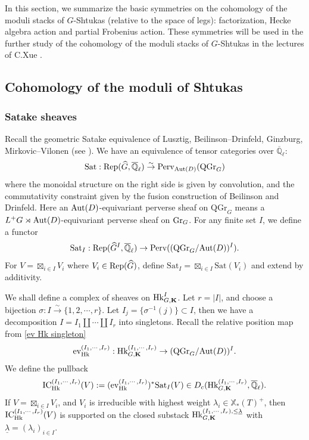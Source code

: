 \documentclass[11pt]{amsart}
\numberwithin{equation}{section}
\theoremstyle{plain}
\theoremstyle{definition}
\def\QQ{\mathbb{Q}}
\def\bK{\mathbf{K}}
\def\dG{\widehat{G}}
\newcommand\ev{\textup{ev}}
\newcommand{\Gr}{\textup{Gr}}
\newcommand{\Hk}{\textup{Hk}}
\newcommand\IC{\textup{IC}}
\newcommand\Perv{\textup{Perv}}
\newcommand\Rep{\textup{Rep}}
\newcommand\Aut{\textup{Aut}}
\newcommand\xcoch{\mathbb{X}_*}
\newcommand{\isom}{\stackrel{\sim}{\to}}
\newcommand{\Qlbar}{\overline{\QQ}_\ell}
\newcommand\un{\underline}
\newcommand\sss{\subsubsection}
\newcommand{\s}{\sigma}
\renewcommand{\l}{\lambda}
\newcommand{\QGr}{\mathrm{QGr}}
\newcommand{\Sat}{\mathrm{Sat}}
\begin{document}
In this section, we summarize the basic symmetries on the cohomology of the moduli stacks of $G$-Shtukas (relative to the space of legs): factorization, Hecke algebra action and partial Frobenius action. These symmetries will be used in the further study of the cohomology of the moduli stacks of $G$-Shtukas in the lectures of C.Xue \cite{Xue}.


 
\subsection{Cohomology of the moduli of Shtukas}


\sss{Satake sheaves}
Recall the geometric Satake equivalence of Lusztig, Beilinson--Drinfeld, Ginzburg, Mirkovic--Vilonen (see \cite{MV}). We have an equivalence of tensor categories over $\Qlbar$:
\begin{equation*}
\Sat: \Rep(\dG,\Qlbar)\isom \Perv_{\Aut(D)}(\QGr_{G})
\end{equation*}
where the monoidal structure on the right side is given by convolution, and the commutativity constraint given by the fusion construction of Beilinson and Drinfeld. Here an $\Aut(D)$-equivariant perverse sheaf on $\QGr_{G}$ means a $L^{+}G\rtimes\Aut(D)$-equivariant perverse sheaf on $\Gr_{G}$. For any finite set $I$, we define a functor
\begin{equation*}
\Sat_{I}: \Rep(\dG^{I},\Qlbar)\to\Perv((\QGr_{G}/\Aut(D))^{I}).
\end{equation*}
For $V=\boxtimes_{i\in I}V_{i}$ where $V_{i}\in \Rep(\dG)$, define $\Sat_{I}=\boxtimes_{i\in I}\Sat(V_{i})$ and extend by additivity.

We shall define a complex of sheaves on $\Hk^{I}_{G,\bK}$. Let $r=|I|$, and choose a bijection $\s: I\isom \{1,2,\cdots, r\}$. Let $I_{j}=\{\s^{-1}(j)\}\subset I$, then we have a decomposition $I=I_{1}\coprod\cdots\coprod I_{r}$ into singletons. Recall the relative position map from \eqref{ev Hk singleton}
\begin{equation*}
\ev^{(I_{1},\cdots, I_{r})}_{\Hk}: \Hk^{(I_{1},\cdots, I_{r})}_{G,\bK}\to (\QGr_{G}/\Aut(D))^{I}.
\end{equation*}
We define the pullback
\begin{equation*}
\IC^{(I_{1},\cdots, I_{r})}_{\Hk}(V):=(\ev^{(I_{1},\cdots, I_{r})}_{\Hk})^{*}\Sat_{I}(V)\in D_{c}(\Hk^{(I_{1},\cdots, I_{r})}_{G,\bK}, \Qlbar).
\end{equation*}
If $V=\boxtimes_{i\in I}V_{i}$, and $V_{i}$ is irreducible with highest weight $\l_{i}\in\xcoch(T)^{+}$, then $\IC^{(I_{1},\cdots, I_{r})}_{\Hk}(V)$ is supported on the closed substack $\Hk^{(I_{1},\cdots, I_{r}), \le\un\l}_{G,\bK}$ with $\un\l=(\l_{i})_{i\in I}$.
\end{document}

